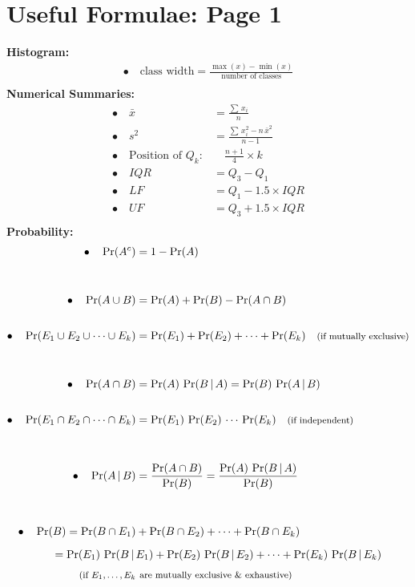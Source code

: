 \documentclass[12pt]{article}
\begin{document}
\section*{Useful Formulae: Page 1\\[0.3cm]}
{\bf Histogram:}\\[-0.8cm]
\begin{align*}
\bullet\quad \text{class width} = \frac{\max(x) - \min(x)}{\text{number of classes}}\\
\end{align*}
{\bf Numerical Summaries:}\\[-0.8cm]
\begin{align*}
\bullet\quad \bar x &= \frac{\sum\,x_i}{n}\\[0.6cm]
\bullet\quad s^2 &= \frac{\sum\,x_i^2 - n\,\bar x^2}{n-1}\\[0.6cm]
\bullet\quad \text{Position of } Q_k:& \quad \frac{n+1}{4}\times k \\[0.6cm]
\bullet\quad IQR &= Q_3 - Q_1 \\[0.6cm]
\bullet\quad LF &= Q_1 - 1.5 \times IQR \\[0.6cm]
\bullet\quad UF &= Q_3 + 1.5 \times IQR\\
\end{align*}
{\bf Probability:}\\[-0.8cm]
\begin{align*}
\bullet\quad \Pr(A^c) &= 1 - \Pr(A) \\[1cm]
\bullet\quad \Pr(A \cup B) &= \Pr(A) + \Pr(B) - \Pr(A \cap B)\\[0.6cm]
\bullet\quad \Pr(E_1 \cup E_2 \cup \cdots \cup E_k) &= \Pr(E_1) + \Pr(E_2) + \cdots + \Pr(E_k) \text{\quad{\footnotesize(if mutually exclusive)}}\\[1cm]
\bullet\quad \Pr(A \cap B) &= \Pr(A) \, \Pr(B \, | \, A) = \Pr(B) \, \Pr(A \, | \, B) \\[0.6cm]
\bullet\quad \Pr(E_1 \cap E_2 \cap \cdots \cap E_k) &= \Pr(E_1) \, \Pr(E_2) \, \cdots \, \Pr(E_k) \text{\quad{\footnotesize(if independent)}}\\[1cm]
\bullet\quad \Pr(A\,|\,B) &= \frac{\Pr(A \cap B)}{\Pr(B)} = \frac{\Pr(A) \,\Pr(B\,|\,A)}{\Pr(B)}\\[1cm]
\bullet\quad \Pr(B) = \Pr(B \cap E_1) &+ \Pr(B \cap E_2) + \cdots + \Pr(B \cap E_k) \\[0.2cm]
= \Pr(E_1) \, \Pr(B\,|\,&E_1) + \Pr(E_2) \, \Pr(B\,|\,E_2) + \cdots + \Pr(E_k) \, \Pr(B\,|\,E_k)\\[0.1cm]
\text{{\footnotesize(if $E_1,\ldots, E_k$}} & \,\, \text{{\footnotesize are mutually exclusive \& exhaustive)}}
\end{align*}
\end{document}
